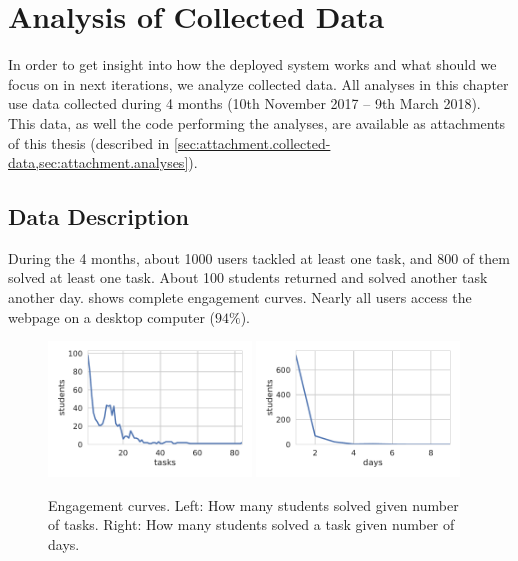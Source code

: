 \chapter{Analysis of Collected Data}
\label{chap:analysis}

In order to get insight into how the deployed system works
and what should we focus on in next iterations,
we analyze collected data.
All analyses in this chapter use data collected  %
during 4 months (10th November 2017 -- 9th March 2018).
This data, as well the code performing the analyses, are available
as attachments of this thesis
(described in \cref{sec:attachment.collected-data,sec:attachment.analyses}).


\section{Data Description}

During the 4 months, about 1000 users tackled at least one task,
and 800 of them solved at least one task.
About 100 students returned and solved another task another day.
 shows complete engagement curves.
Nearly all users access the webpage on a desktop computer ($94\%$).

\begin{figure}[htb]
\centering
\includegraphics[width=0.48\textwidth]{img/engagement-tasks}
\includegraphics[width=0.48\textwidth]{img/engagement-days}
\caption{%
  Engagement curves.
  Left: How many students solved given number of tasks.
  Right: How many students solved a task given number of days.}
\label{fig:engagement-curves}
\end{figure}


